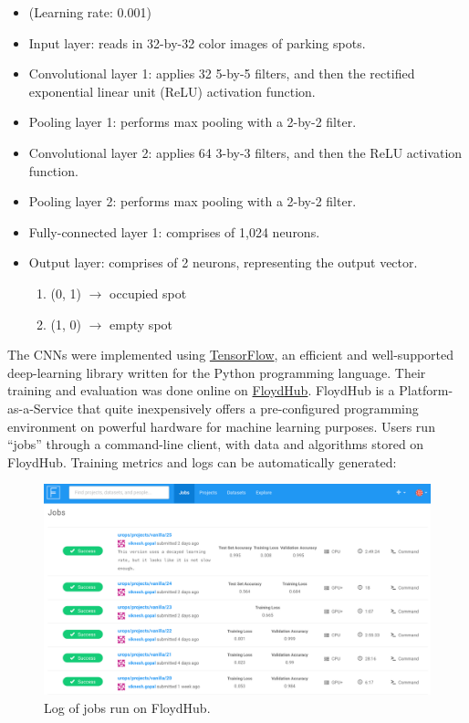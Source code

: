 \documentclass[a4paper, 11pt]{article} %
\begin{document}
	\begin{itemize}
		\setlength\itemsep{-3mm}
		\item[] (Learning rate: 0.001)
		\item[] Input layer: reads in 32-by-32 color images of parking spots.
		\item[] Convolutional layer 1: applies 32 5-by-5 filters, and then the 
		rectified exponential linear unit (ReLU) activation function.
		\item[] Pooling layer 1: performs max pooling with a 2-by-2 filter.
		\item[] Convolutional layer 2: applies 64 3-by-3 filters, and then the 
		ReLU activation function.
		\item[] Pooling layer 2: performs max pooling with a 2-by-2 filter.
		\item[] Fully-connected layer 1: comprises of 1,024 neurons.
		\item[] Output layer: comprises of 2 neurons, representing the output 
		vector.
		\vspace*{-4mm}
		\begin{enumerate}
			\setlength\itemsep{-3mm}
			\item[] (0, 1) $\rightarrow$ occupied spot
			\item[] (1, 0) $\rightarrow$ empty spot
		\end{enumerate}
	\end{itemize}
   	The CNNs were implemented using 
   	\href{https://www.tensorflow.org}{TensorFlow}, an efficient and 
   	well-supported deep-learning library written for the Python programming 
   	language. Their training and 
   	evaluation was done online on 
   	\href{https://www.floydhub.com}{FloydHub}. FloydHub is a 
   	Platform-as-a-Service that quite inexpensively offers a pre-configured programming environment on 
   	powerful hardware for machine learning purposes. Users run ``jobs'' through 
   	a command-line client, 
   	with data and algorithms stored on FloydHub. Training metrics and logs can 
   	be automatically 
    generated:
    \vskip 5mm
    \begin{figure}[H]
    	\centering
    	\includegraphics[width=14cm]{figures/floydhub.png}
    	\caption{Log of jobs run on FloydHub.}
    \end{figure}
\end{document}
